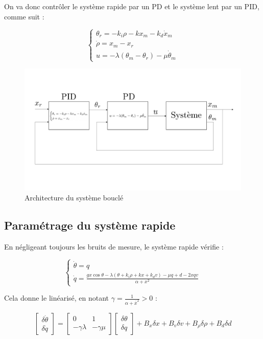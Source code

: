 \documentclass[10pt]{article}
\begin{document}
\noindent On va donc contrôler le système rapide par un PD et le système lent par un PID, comme suit :

\[
	\begin{cases}
		\theta_r = - k_i \rho - k x_m - k_d \dot x_m \\
		\dot \rho = x_m - x_r \\
		u = - \lambda ( \theta_m - \theta_r ) - \mu \dot \theta_m
	\end{cases}
\]

\begin{figure}[H]
	\centering
	\includegraphics[width=\linewidth]{schemaPD+PID.pdf}
	\caption{Architecture du système bouclé}
\end{figure}

\subsection*{Paramétrage du système rapide}

\noindent En négligeant toujours les bruits de mesure, le système rapide vérifie :

\[
	\begin{cases}
		\dot \theta = q \\
		\dot q =
		\frac{gx \cos \theta - \lambda ( \theta + k_i \rho + k x + k_d v ) - \mu q + d - 2xqv}{\alpha + x^2}
	\end{cases}
\]

\noindent Cela donne le linéarisé, en notant $\gamma = \frac{1}{\alpha + \bar x^2} > 0$ :

\[
	\begin{bmatrix}
		\delta \dot \theta \\
		\delta \dot q
	\end{bmatrix}
	=\begin{bmatrix}
		0 & 1 \\
		- \gamma \lambda & - \gamma \mu
	\end{bmatrix}
	\begin{bmatrix}
		\delta \theta \\
		\delta q
	\end{bmatrix} +
	B_x \delta x +
	B_v \delta v +
	B_\rho \delta \rho +
	B_d \delta d
\]
\end{document}
